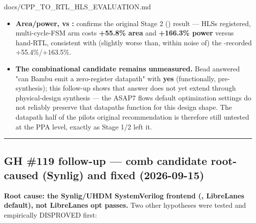 \begin{relocated}{docs/CPP_TO_RTL_HLS_EVALUATION.md}
\begin{itemize}
\tightlist
\item
  \textbf{Area/\allowbreak{}power,  vs :} confirms
  the original Stage 2 () result --- HLS\textquotesingle s
  registered, multi-cycle-FSM arm costs \textbf{+55.8\% area} and
  \textbf{+166.3\% power} versus hand-RTL, consistent with (slightly
  worse than, within noise of) the -recorded
  +55.4\%/\allowbreak{}+163.5\%.
\item
  \textbf{The combinational candidate remains unmeasured.} Bead
   answered "can Bambu emit a zero-register datapath" with
  \textbf{yes} (functionally, pre-synthesis); this follow-up shows that
  answer does not yet extend through physical-design synthesis --- the
  ASAP7 flow\textquotesingle s default optimization settings do not
  reliably preserve that datapath\textquotesingle s function for this
  design shape. The datapath half of the pilot\textquotesingle s
  original recommendation is therefore still untested at the PPA level,
  exactly as Stage 1/2 left it.
\end{itemize}

\begin{center}\rule{0.5\linewidth}{0.5pt}\end{center}

\subsection{\texorpdfstring{GH \#119  follow-up --- comb
candidate root-caused (Synlig) and fixed
(2026-09-15)}{GH \#119  follow-up --- comb candidate root-caused (Synlig) and fixed (2026-09-15)}}\label{tm:dec:cpp-to-rtl-hls-evaluation:gh-119-gcd-follow-up-comb-candidate-root-caused-synlig-and-fixed-2026-09-15}

\textbf{Root cause: the Synlig/\allowbreak{}UHDM SystemVerilog frontend
(, LibreLane\textquotesingle s default), not
LibreLane\textquotesingle s opt passes.} Two other hypotheses were
tested and empirically DISPROVED first:


\end{relocated}
